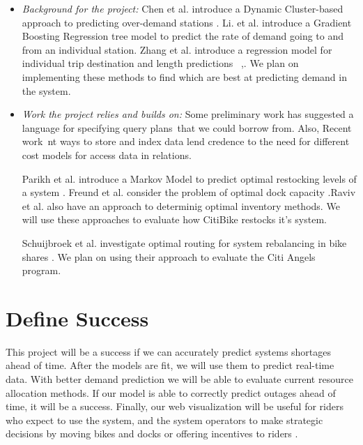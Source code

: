 \documentclass{proc}
\begin{document}
\begin{itemize}
\item \emph{Background for the project:} Chen et al. introduce a Dynamic Cluster-based approach to predicting over-demand stations \cite{chen}.  Li. et al. introduce a Gradient Boosting Regression tree model to predict the rate of demand going to and from an individual station.  Zhang et al. introduce a regression model for individual trip destination and length predictions~ \cite{zhang},. We plan on implementing these methods to find which are best at predicting demand in the system.





\item \emph{Work the project relies and builds on: } Some preliminary work has suggested a language for specifying query plans~that we could borrow from.  Also, Recent work~nt ways to store and index data lend credence to the need for different cost models for access data in relations.



Parikh et al. introduce a Markov Model to predict optimal restocking levels of a system \cite{parikh}. Freund et al. consider the problem of optimal dock capacity \cite{freund}.Raviv et al. also have an approach to determinig optimal inventory methods. We will use these approaches to evaluate how CitiBike restocks it's system.

Schuijbroek et al. investigate optimal routing for system rebalancing in bike shares \cite{schu}. We plan on using their approach to evaluate the Citi Angels program.
\end{itemize}


\section{Define Success}


This project will be a success if we can accurately predict systems shortages ahead of time. After the models are fit, we will use them to predict real-time data. With better demand prediction we will be able to evaluate current resource allocation methods. If our model is able to correctly predict outages ahead of time, it will be a success.  Finally, our web visualization will be useful for riders who expect to use the system, and the system operators to make strategic decisions by moving bikes and docks or offering incentives to riders
.
\end{document}
